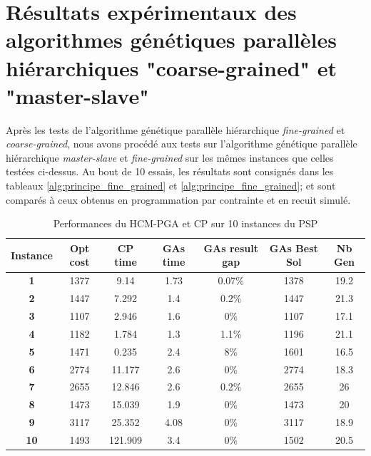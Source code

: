 \documentclass[12pt,a4paper]{article}
\begin{document}
		\section{Résultats expérimentaux des algorithmes génétiques parallèles hiérarchiques "coarse-grained" et "master-slave"}
		
		Après les tests de l'algorithme génétique parallèle hiérarchique \emph{fine-grained} et \emph{coarse-grained}, nous avons procédé aux tests sur l'algorithme génétique parallèle hiérarchique \emph{master-slave} et \emph{fine-grained} sur les mêmes instances que celles testées ci-dessus. Au bout de 10 essais, les résultats sont consignés dans les tableaux \ref{alg:principe_fine_grained}  et \ref{alg:principe_fine_grained}; et sont comparés à ceux obtenus en programmation par contrainte et en recuit simulé.
		
		\begin{table}[h]
		\centering
		\begin{tabular}{|c|c|c|c|c|c|c|}
			\hline
			\textbf{Instance} & \textbf{Opt cost} & \textbf{CP time} & \textbf{GAs time} & \textbf{GAs result gap} & \textbf{GAs Best Sol} & \textbf{Nb Gen}\\
			\hline
			\textbf{1} & 1377 & 9.14 & 1.73 & 0.07\% & 1378 & 19.2 \\
			\textbf{2} & 1447 & 7.292 & 1.4 & 0.2\% & 1447 & 21.3\\
			\textbf{3} & 1107 & 2.946 & 1.6 & 0\% & 1107 & 17.1\\
			\textbf{4} & 1182 & 1.784 & 1.3 & 1.1\% & 1196 & 21.1\\
			\textbf{5} & 1471 & 0.235 & 2.4 & 8\% & 1601 & 16.5\\
			\textbf{6} & 2774 & 11.177 & 2.6 & 0\% & 2774 & 18.3\\
			\textbf{7} & 2655 & 12.846 & 2.6 & 0.2\% & 2655 & 26\\
			\textbf{8} & 1473 & 15.039 & 1.9 & 0\% & 1473 & 20\\
			\textbf{9} & 3117 & 25.352 & 4.08 & 0\% & 3117 & 18.9\\
			\textbf{10} & 1493 & 121.909 & 3.4 & 0\% & 1502 & 20.5\\
			\hline
		\end{tabular}	
		\caption{Performances du HCM-PGA et CP sur 10 instances du PSP}	
	\end{table}	
	
\end{document}
